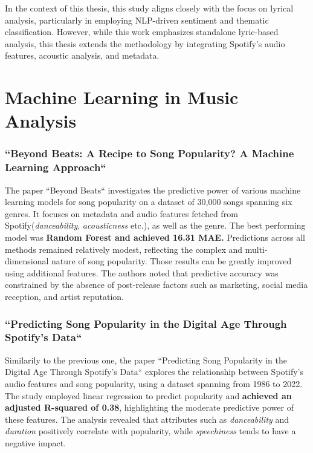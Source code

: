 In the context of this thesis, this study aligns closely with the focus on
lyrical analysis, particularly in employing NLP-driven sentiment and thematic
classification. However, while this work emphasizes standalone lyric-based
analysis, this thesis extends the methodology by integrating Spotify’s audio
features, acoustic analysis, and metadata. 


\section{Machine Learning in Music Analysis}
\label{sec:machinelearningfeaturesinmusicanalysis}

\subsubsection*{``Beyond Beats: A Recipe to Song Popularity? A Machine Learning Approach``}

The paper ``Beyond Beats`` investigates the predictive power of various machine
learning models for song popularity on a dataset of 30,000 songs spanning six
genres. It focuses on metadata and audio features fetched from
Spotify(\textit{danceability}, \textit{acousticness} etc.), as well as the
genre. The best performing model was \textbf{Random Forest and achieved 16.31 MAE.}
Predictions across all methods remained relatively modest, reflecting the
complex and multi-dimensional  nature of song popularity. Those results can be
greatly improved using additional features. The authors noted that predictive
accuracy was constrained by the absence of post-release factors such as
marketing, social media reception, and artist reputation.\cite{beyond_beats}


\subsubsection*{``Predicting Song Popularity in the Digital Age Through
Spotify’s Data``}  
Similarily to the previous one, the paper ``Predicting Song Popularity in the
Digital Age Through Spotify’s Data`` explores the relationship between
Spotify's audio features  and song popularity, using a dataset spanning from
1986 to 2022. The study employed linear regression to predict popularity and
\textbf{achieved an adjusted R-squared of 0.38}, highlighting the moderate
predictive power of these features. The analysis revealed that attributes such
as \textit{danceability} and \textit{duration} positively correlate with
popularity, while \textit{speechiness} tends to have a negative
impact.\cite{predicting_song_popularity_2024}
